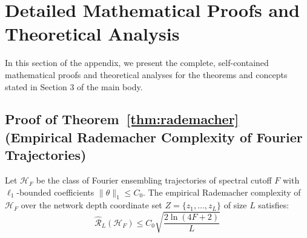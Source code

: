 \section{Detailed Mathematical Proofs and Theoretical Analysis}
\label{sec:appendix_proofs}

In this section of the appendix, we present the complete, self-contained mathematical proofs and theoretical analyses for the theorems and concepts stated in Section 3 of the main body.

\subsection{Proof of Theorem~\ref{thm:rademacher} (Empirical Rademacher Complexity of Fourier Trajectories)}
\label{proof:thm_rademacher}

\begin{theorem}
Let $\mathcal{H}_F$ be the class of Fourier ensembling trajectories of spectral cutoff $F$ with $\ell_1$-bounded coefficients $\|\theta\|_1 \le C_0$. The empirical Rademacher complexity of $\mathcal{H}_F$ over the network depth coordinate set $Z = \{z_1, \dots, z_L\}$ of size $L$ satisfies:
\begin{equation}
    \widehat{\mathcal{R}}_L(\mathcal{H}_F) \le C_0 \sqrt{\frac{2 \ln(4F+2)}{L}}
\end{equation}
\end{theorem}


